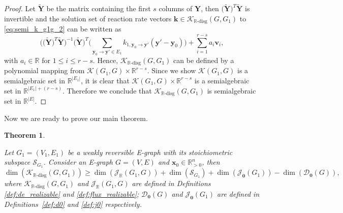 \documentclass[11pt]{article}
\theoremstyle{plain}
\newtheorem{theorem}{Theorem}[section]
\theoremstyle{definition}
\theoremstyle{remark}
\newcommand\RR{\mathbb{R}}
\newcommand\by{\boldsymbol{y}}
\newcommand\bk{\boldsymbol{k}}
\newcommand\bx{\boldsymbol{x}}
\newcommand\bv{\boldsymbol{v}}
\newcommand\bY{\boldsymbol{Y}}
\newcommand{\mK}{\mathcal{K}}
\newcommand{\dK}{\mathcal{K}_{\RR\text{-disg}}}
\newcommand{\mJ}{\mathcal{J}_{\RR}}
\newcommand{\eJ}{\mathcal{J}_{\textbf{0}}}
\newcommand{\mD}{\mathcal{D}_{\textbf{0}}}
\newcommand{\mS}{\mathcal{S}}
\begin{document}
\begin{proof}
Let $\tilde{\bY}$ be the matrix containing the first $s$ columns of $\bY$, then $\big( \tilde{\bY} \big)^T \tilde{\bY}$ is invertible  and the solution set of reaction rate vectors $\bk \in \dK (G, G_1)$ to \eqref{eq:semi_k_g1g_2} can be written as 
\begin{equation} \label{eq:semi_k_g1g_3}
\Big( \big( \tilde{\bY} \big)^T \tilde{\bY} \Big)^{-1}
\big( \tilde{\bY} \big)^T \big( \sum_{\by_0 \to \by' \in E_1} k_{1, \by_0  \to \by'}  (\by' - \by_0) \big)
+ \sum\limits^{r-s}_{i=1} a_i \bv_i,
\end{equation}
with $a_i \in \RR$ for $1 \leq i \leq r-s$. 
Hence, $\dK (G, G_1)$ can be defined by a polynomial mapping from $\mK (G_1, G) \times \RR^{r-s}$.
Since we show $\mK (G_1, G)$ is a semialgebraic set in $\RR^{|E_1|}$, it is clear that $\mK (G_1, G) \times \RR^{r-s}$ is a semialgebraic set in $\RR^{|E_1| + (r-s)}$.
Therefore we conclude that $\dK (G, G_1)$ is semialgebraic set in $\RR^{|E|}$.
\end{proof}


Now we are ready to prove our main theorem.

\begin{theorem}
\label{thm:dim_kisg}

Let $G_1 = (V_1, E_1)$ be a weakly reversible E-graph with its stoichiometric subspace $\mS_{G_1}$. Consider an E-graph $G = (V, E)$ and $\bx_0\in\mathbb{R}^n_{>0}$, then
\begin{equation} \label{eq:dim_kisg}
\dim(\dK(G,G_1)) \geq \dim (\mJ(G_1,G)) + \dim (\mS_{G_1})  + \dim(\eJ(G_1)) - \dim(\mD(G)),
\end{equation}
where $\dK(G,G_1)$ and $\mJ(G_1,G)$ are defined in Definitions \ref{def:de_realizable} and \ref{def:flux_realizable}; $\mD(G)$ and $\eJ(G_1)$ are defined in Definitions~\ref{def:d0} and \ref{def:j0} respectively.
\end{theorem}

\end{document}
